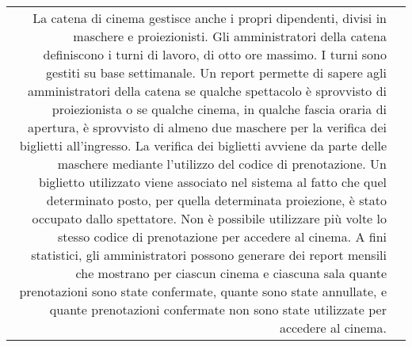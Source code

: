 \begin{tabularx}{\linewidth}{r|>{\internallinenumbers}X|}
    La catena di cinema gestisce anche i propri dipendenti, divisi in
    maschere e proiezionisti.
    Gli amministratori della catena definiscono i turni di lavoro,
    di otto ore massimo. I turni sono gestiti su base settimanale.
    Un report permette di sapere agli amministratori della catena se qualche
    spettacolo è sprovvisto di proiezionista o se qualche cinema, in qualche
    fascia oraria di apertura, è sprovvisto di almeno due maschere per la
    verifica dei biglietti all’ingresso.
    \newline
    \newline
    La verifica dei biglietti avviene da parte delle maschere mediante
    l’utilizzo del codice di prenotazione.
    Un biglietto utilizzato viene associato nel sistema al fatto che quel
    determinato posto, per quella determinata proiezione, è stato occupato
    dallo spettatore.
    Non è possibile utilizzare più volte lo stesso codice di prenotazione
    per accedere al cinema.
    \newline
    \newline
    A fini statistici, gli amministratori possono generare dei report mensili
    che mostrano per ciascun cinema e ciascuna sala quante prenotazioni sono
    state confermate, quante sono state annullate, e quante prenotazioni
    confermate non sono state utilizzate per accedere al cinema.
    \\\cline{2-2}
\end{tabularx}

